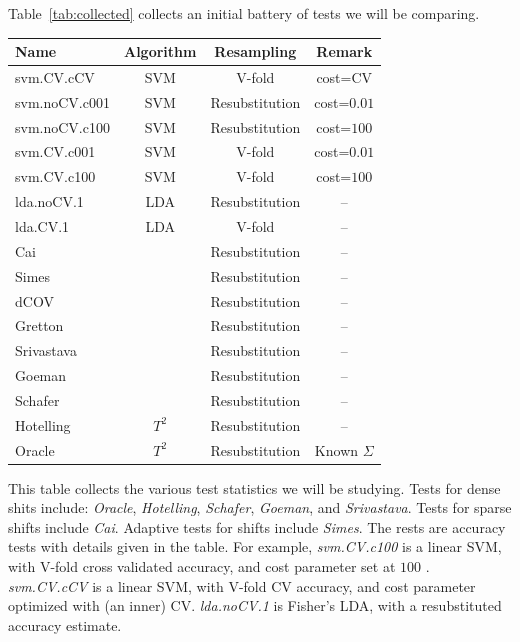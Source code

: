 \documentclass[onecolumn,draftclsnofoot]{IEEEtran}
\begin{document}
Table~\ref{tab:collected} collects an initial battery of tests we will be comparing. 
\begin{tcolorbox}
	\centering
	\footnotesize
	\begin{tabular}{l|c|c|c}
		Name & Algorithm & Resampling & Remark\\ 
		\hline
		\hline
		svm.CV.cCV 	& SVM & V-fold  & cost=CV \\ 
		svm.noCV.c001 	& SVM & Resubstitution  & cost=$0.01$ \\ 
		svm.noCV.c100 	& SVM & Resubstitution  & cost=$100$ \\ 
		svm.CV.c001	& SVM & V-fold 		    & cost=$0.01$ \\ 
		svm.CV.c100	& SVM & V-fold 		    & cost=$100$ \\ 
		lda.noCV.1 	& LDA & Resubstitution 	&  --\\ 
		lda.CV.1 	& LDA & V-fold 			&  -- \\ 
		Cai & \cite{cai_two-sample_2013} & Resubstitution & -- \\ 
		Simes & \cite{simes1986improved} & Resubstitution & -- \\ 
		dCOV & \cite{szekely2004testing} & Resubstitution & -- \\ 
		Gretton & \cite{gretton_kernel_2012-1} & Resubstitution & -- \\ 
		Srivastava & \cite{srivastava_test_2008} & Resubstitution & -- \\ 
		Goeman & \cite{goeman2006testing} & Resubstitution & -- \\ 
		Schafer & \cite{schafer_shrinkage_2005} & Resubstitution & -- \\ 
		Hotelling & $T^2$ & Resubstitution & -- \\
		Oracle & $T^2$ & Resubstitution & Known $\Sigma$\\ 
	\end{tabular} 
	\captionsetup{type=table}
	\caption{\footnotesize
		This table collects the various test statistics we will be studying. 
		Tests for dense shits include: \textit{Oracle}, \textit{Hotelling}, \textit{Schafer}, \textit{Goeman}, and \textit{Srivastava}.
		Tests for sparse shifts include \textit{Cai}.
		Adaptive tests for shifts include \textit{Simes}.
		The rests are accuracy tests with details given in the table. 	
		For example, \textit{svm.CV.c100} is a linear SVM, with V-fold cross validated accuracy, and cost parameter set at $100$ \cite{meyer_e1071:_2015}.
		\textit{svm.CV.cCV} is a linear SVM, with V-fold CV accuracy, and cost parameter optimized with (an inner) CV. 
		\textit{lda.noCV.1} is Fisher's LDA, with a resubstituted accuracy estimate.
		}
	\label{tab:collected}
\end{tcolorbox}
\end{document}
